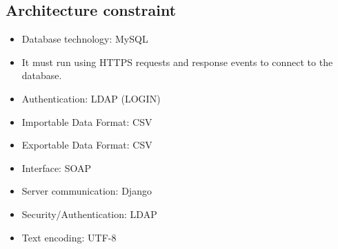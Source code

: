 \documentclass[10pt,a4paper]{article}
\begin{document}
\subsection{Architecture constraint}
       \begin{itemize}
                \item Database technology: MySQL
        \end{itemize}
                \begin{itemize}
                        \item  It must run using HTTPS requests and response events to connect to the database.
                \end{itemize}
                \begin{itemize}
                        \item Authentication: LDAP (LOGIN)                 
                                \end{itemize}
                \begin{itemize}
                        \item Importable Data Format: CSV
                \end{itemize}
                \begin{itemize}
                        \item Exportable Data Format: CSV
                \end{itemize}
                \begin{itemize}
                        \item Interface: SOAP
                \end{itemize}
                \begin{itemize}
                        \item Server communication: Django
                \end{itemize}
                \begin{itemize}
                        \item Security/Authentication: LDAP
                \end{itemize}
                \begin{itemize}
                        \item Text encoding: UTF-8
                \end{itemize}
\end{document}
